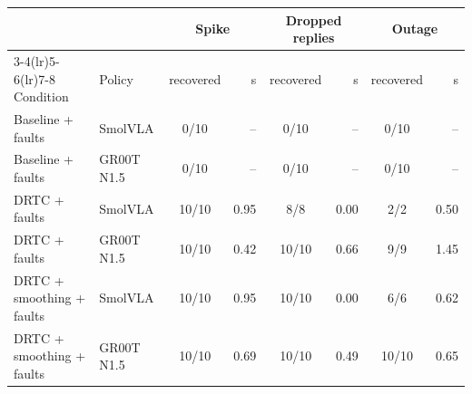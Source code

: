 \begin{tabular}{l l cr cr cr}
\toprule
 & & \multicolumn{2}{c}{Spike} & \multicolumn{2}{c}{Dropped replies} & \multicolumn{2}{c}{Outage} \\
\cmidrule(lr){3-4}\cmidrule(lr){5-6}\cmidrule(lr){7-8}
Condition & Policy & recovered & s & recovered & s & recovered & s \\
\midrule
Baseline + faults & SmolVLA & 0/10 & -- & 0/10 & -- & 0/10 & -- \\
Baseline + faults & GR00T N1.5 & 0/10 & -- & 0/10 & -- & 0/10 & -- \\
DRTC + faults & SmolVLA & 10/10 & 0.95 & 8/8 & 0.00 & 2/2 & 0.50 \\
DRTC + faults & GR00T N1.5 & 10/10 & 0.42 & 10/10 & 0.66 & 9/9 & 1.45 \\
DRTC + smoothing + faults & SmolVLA & 10/10 & 0.95 & 10/10 & 0.00 & 6/6 & 0.62 \\
DRTC + smoothing + faults & GR00T N1.5 & 10/10 & 0.69 & 10/10 & 0.49 & 10/10 & 0.65 \\
\bottomrule
\end{tabular}
